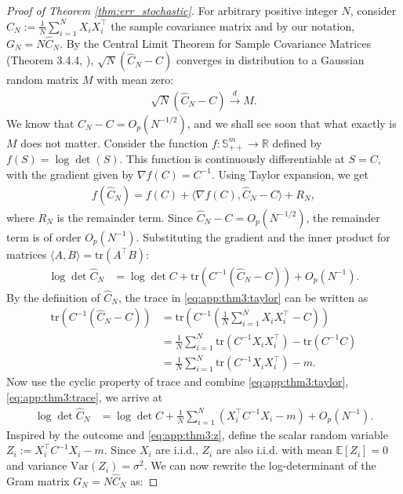 \documentclass{article}
\theoremstyle{plain}
\theoremstyle{definition}
\theoremstyle{remark}
\begin{document}
\begin{proof}[Proof of Theorem \ref{thm:err_stochastic}]
For arbitrary positive integer $N$, consider $\hat{C}_N := \frac{1}{N} \sum_{i=1}^N X_i X_i^\top$ the sample covariance matrix and by our notation, $G_N = N\hat{C}_N$. By the Central Limit Theorem for Sample Covariance Matrices (Theorem 3.4.4, \cite{Anderson_2003}), $\sqrt{N}(\hat{C}_N - C)$ converges in distribution to a Gaussian random matrix $M$ with mean zero:
\begin{align}
    \sqrt{N}(\hat{C}_N - C) \xrightarrow{d} M.
\end{align}
We know that $\hat{C}_N - C = O_p(N^{-1/2})$, and we shall see soon that what exactly is $M$ does not matter. Consider the function $f: \mathbb{S}_{++}^m \to \mathbb{R}$ defined by $f(S) = \log \det(S)$. This function is continuously differentiable at $S=C$, with the gradient given by $\nabla f(C) = C^{-1}$. Using Taylor expansion, we get
\begin{align}
    f(\hat{C}_N) = f(C) + \langle \nabla f(C), \hat{C}_N - C \rangle + R_N,
\end{align}
where $R_N$ is the remainder term. Since $\hat{C}_N - C = O_p(N^{-1/2})$, the remainder term is of order $O_p(N^{-1})$. Substituting the gradient and the inner product for matrices $\langle A, B \rangle = \text{tr}(A^\top B)$:
\begin{align} \label{eq:app:thm3:taylor}
    \log \det \hat{C}_N &= \log \det C + \text{tr}\left( C^{-1} (\hat{C}_N - C) \right) + O_p(N^{-1}).
\end{align}
By the definition of $\hat{C}_N$, the trace in \eqref{eq:app:thm3:taylor} can be written as
\begin{align} \label{eq:app:thm3:trace}
    \text{tr}\left( C^{-1} (\hat{C}_N - C) \right) &= \text{tr}\left( C^{-1} \left( \frac{1}{N} \sum_{i=1}^N X_i X_i^\top - C \right) \right) \nonumber \\
    &= \frac{1}{N} \sum_{i=1}^N \text{tr}(C^{-1} X_i X_i^\top) - \text{tr}(C^{-1} C) \nonumber \\
    &=\frac{1}{N} \sum_{i=1}^N \text{tr}(C^{-1} X_i X_i^\top) - m.
\end{align}
Now use the cyclic property of trace and combine \eqref{eq:app:thm3:taylor}, \eqref{eq:app:thm3:trace}, we arrive at
\begin{align}
    \log \det \hat{C}_N &= \log \det C + \frac{1}{N} \sum_{i=1}^N (X_i^\top C^{-1} X_i - m) + O_p(N^{-1}).
\end{align}
Inspired by the outcome and \eqref{eq:app:thm3:z}, define the scalar random variable $Z_i := X_i^\top C^{-1} X_i - m$. Since $X_i$ are i.i.d., $Z_i$ are also i.i.d. with mean $\mathbb{E}[Z_i] = 0$ and variance $\text{Var}(Z_i) = \sigma^2$. We can now rewrite the log-determinant of the Gram matrix $G_N = N \hat{C}_N$ as:

\end{proof}
\end{document}
